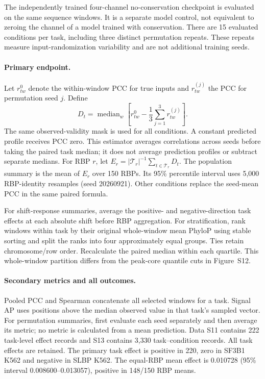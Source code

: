 \documentclass[11pt]{article}
\begin{document}
The independently trained four-channel no-conservation checkpoint is evaluated on the same sequence windows. It is a separate model control, not equivalent to zeroing the channel of a model trained with conservation. There are 15 evaluated conditions per task, including three distinct permutation repeats. These repeats measure input-randomization variability and are not additional training seeds.

\paragraph{Primary endpoint.} Let $r^0_{tw}$ denote the within-window PCC for true inputs and $r^{(j)}_{tw}$ the PCC for permutation seed $j$. Define
\begin{equation}
D_t=\operatorname{median}_w\left[r^0_{tw}-\frac{1}{3}\sum_{j=1}^3r^{(j)}_{tw}\right].
\end{equation}
The same observed-validity mask is used for all conditions. A constant predicted profile receives PCC zero. This estimator averages correlations across seeds before taking the paired task median; it does not average prediction profiles or subtract separate medians. For RBP $r$, let $E_r=|\mathcal T_r|^{-1}\sum_{t\in\mathcal T_r}D_t$. The population summary is the mean of $E_r$ over 150 RBPs. Its 95\% percentile interval uses 5,000 RBP-identity resamples (seed 20260921). Other conditions replace the seed-mean PCC in the same paired formula.

For shift-response summaries, average the positive- and negative-direction task effects at each absolute shift before RBP aggregation. For stratification, rank windows within task by their original whole-window mean PhyloP using stable sorting and split the ranks into four approximately equal groups. Ties retain chromosome/row order. Recalculate the paired median within each quartile. This whole-window partition differs from the peak-core quantile cuts in Figure~S12.

\paragraph{Secondary metrics and all outcomes.} Pooled PCC and Spearman concatenate all selected windows for a task. Signal AP uses positions above the median observed value in that task's sampled vector. For permutation summaries, first evaluate each seed separately and then average its metric; no metric is calculated from a mean prediction. Data S11 contains 222 task-level effect records and S13 contains 3,330 task--condition records. All task effects are retained. The primary task effect is positive in 220, zero in SF3B1 K562 and negative in SLBP K562. The equal-RBP mean effect is 0.010728 (95\% interval 0.008600--0.013057), positive in 148/150 RBP means.
\end{document}
